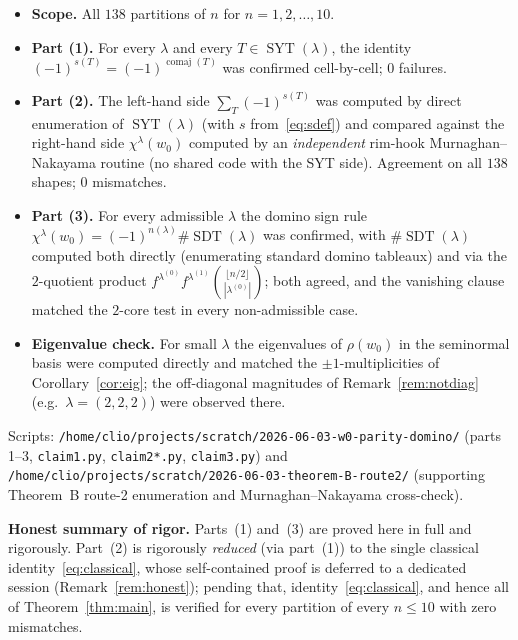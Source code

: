\documentclass[11pt]{article}
\theoremstyle{definition}
\DeclareMathOperator{\comaj}{comaj}
\DeclareMathOperator{\SYT}{SYT}
\DeclareMathOperator{\SDT}{SDT}
\newcommand{\wzero}{w_0}
\begin{document}
\begin{itemize}
\item \textbf{Scope.}  All $138$ partitions of $n$ for $n=1,2,\dots,10$.
\item \textbf{Part (1).}  For every $\lambda$ and every $T\in\SYT(\lambda)$, the
identity $(-1)^{s(T)}=(-1)^{\comaj(T)}$ was confirmed cell-by-cell; $0$ failures.
\item \textbf{Part (2).}  The left-hand side $\sum_T(-1)^{s(T)}$ was computed by
direct enumeration of $\SYT(\lambda)$ (with $s$ from~\eqref{eq:sdef}) and compared
against the right-hand side $\chi^\lambda(\wzero)$ computed by an
\emph{independent} rim-hook Murnaghan--Nakayama routine (no shared code with the
SYT side).  Agreement on all $138$ shapes; $0$ mismatches.
\item \textbf{Part (3).}  For every admissible $\lambda$ the domino sign rule
$\chi^\lambda(\wzero)=(-1)^{n(\lambda)}\#\SDT(\lambda)$ was confirmed, with
$\#\SDT(\lambda)$ computed both directly (enumerating standard domino tableaux)
and via the $2$-quotient product $f^{\lambda^{(0)}}f^{\lambda^{(1)}}
\binom{\lfloor n/2\rfloor}{|\lambda^{(0)}|}$; both agreed, and the vanishing
clause matched the $2$-core test in every non-admissible case.
\item \textbf{Eigenvalue check.}  For small $\lambda$ the eigenvalues of
$\rho(\wzero)$ in the seminormal basis were computed directly and matched the
$\pm1$-multiplicities of Corollary~\ref{cor:eig}; the off-diagonal magnitudes of
Remark~\ref{rem:notdiag} (e.g.\ $\lambda=(2,2,2)$) were observed there.
\end{itemize}

Scripts:
\verb|/home/clio/projects/scratch/2026-06-03-w0-parity-domino/|
(parts 1--3, \verb|claim1.py|, \verb|claim2*.py|, \verb|claim3.py|) and
\verb|/home/clio/projects/scratch/2026-06-03-theorem-B-route2/|
(supporting Theorem~B route-2 enumeration and Murnaghan--Nakayama cross-check).

\medskip
\noindent\textbf{Honest summary of rigor.}
Parts~(1) and~(3) are proved here in full and rigorously.  Part~(2) is rigorously
\emph{reduced} (via part~(1)) to the single classical identity~\eqref{eq:classical},
whose self-contained proof is deferred to a dedicated session
(Remark~\ref{rem:honest}); pending that, identity~\eqref{eq:classical}, and hence
all of Theorem~\ref{thm:main}, is verified for every partition of every $n\le10$
with zero mismatches.
\end{document}
